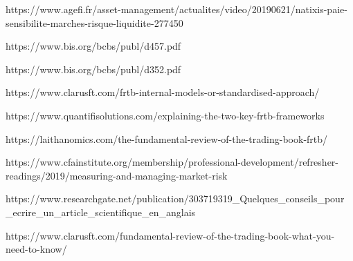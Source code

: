 \documentclass[3pt]{article}
\begin{document}
https://www.agefi.fr/asset-management/actualites/video/20190621/natixis-paie-sensibilite-marches-risque-liquidite-277450

https://www.bis.org/bcbs/publ/d457.pdf

https://www.bis.org/bcbs/publ/d352.pdf

https://www.clarusft.com/frtb-internal-models-or-standardised-approach/

https://www.quantifisolutions.com/explaining-the-two-key-frtb-frameworks

https://laithanomics.com/the-fundamental-review-of-the-trading-book-frtb/

https://www.cfainstitute.org/membership/professional-development/refresher-readings/2019/measuring-and-managing-market-risk

https://www.researchgate.net/publication/303719319\_Quelques\_conseils\_pour%
\_ecrire\_un\_article\_scientifique\_en\_anglais

https://www.clarusft.com/fundamental-review-of-the-trading-book-what-you-need-to-know/
\end{document}
